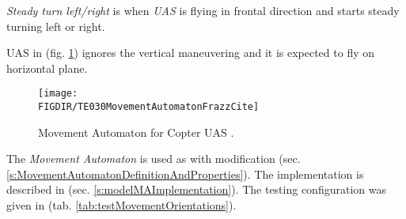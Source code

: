 \emph{Steady turn left/right} is when \emph{UAS} is flying in frontal direction and starts steady turning left or right. 

\begin{note}
UAS in (fig. \ref{fig:movementAutomatonExampleTheory}) ignores the vertical maneuvering and it is expected to fly on horizontal plane.
\end{note}


\begin{figure}[H]
    \centering
    \texttt{[image: \\FIGDIR/TE030MovementAutomatonFrazzCite]} 
    \caption{Movement Automaton for Copter UAS \cite{frazzoli2001robust}.}
    \label{fig:movementAutomatonExampleTheory}
\end{figure}

\begin{note}
The \emph{Movement Automaton} is used as with modification (sec. \ref{s:MovementAutomatonDefinitionAndProperties}). The implementation is described in (sec. \ref{s:modelMAImplementation}). The testing configuration was given in (tab. \ref{tab:testMovementOrientations}).
\end{note}

